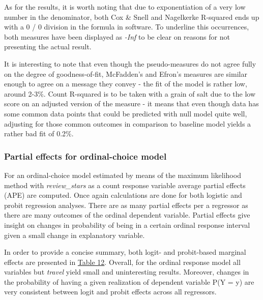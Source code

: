 \documentclass{article}
\begin{document}
As for the results, it is worth noting that due to exponentiation of a very low number in the denominator, both Cox \& Snell and Nagelkerke R-squared ends up with a 0 / 0 division in the formula in software. To underline this occurrences, both measures have been displayed as \textit{-Inf} to be clear on reasons for not presenting the actual result. 

It is interesting to note that even though the pseudo-measures do not agree fully on the degree of goodness-of-fit, McFadden's and Efron's measures are similar enough to agree on a message they convey - the fit of the model is rather low, around 2-3\%. Count R-squared is to be taken with a grain of salt due to the low score on an adjusted version of the measure - it means that even though data has some common data points that could be predicted with null model quite well, adjusting for those common outcomes in comparison to baseline model yields a rather bad fit of 0.2\%.

\subsubsection{Partial effects for ordinal-choice model}

For an ordinal-choice model estimated by means of the maximum likelihood method with \textit{review\_stars} as a count response variable average partial effects (APE) are computed. Once again calculations are done for both logistic and probit regression analyses. There are as many partial effects per a regressor as there are many outcomes of the ordinal dependent variable. Partial effects give insight on changes in probability of being in a certain ordinal response interval given a small change in explanatory variable.

In order to provide a concise summary, both logit- and probit-based marginal effects are presented in \hyperref[tab:partialordinal]{Table 12}. Overall, for the ordinal response model all variables but \textit{travel} yield small and uninteresting results. Moreover, changes in the probability of having a given realization of dependent variable P(Y = y) are very consistent between logit and probit effects across all regressors.
\end{document}
